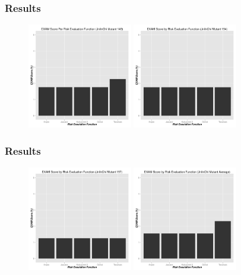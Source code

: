 \documentclass{beamer}
\begin{document}
	\begin{frame}
	\frametitle{Results}
	\begin{figure}
		\label{results}
		\includegraphics[width=1.8in]{img/graph_149.pdf}
		\includegraphics[width=1.8in]{img/graph_194.pdf}
	\end{figure}
	\end{frame}
	\begin{frame}
	\frametitle{Results}
	\begin{figure}
		\label{results}
		\includegraphics[width=1.8in]{img/graph_197.pdf}
		\includegraphics[width=1.8in]{img/graph_avg.pdf}
	\end{figure}
	\end{frame}
\end{document}
